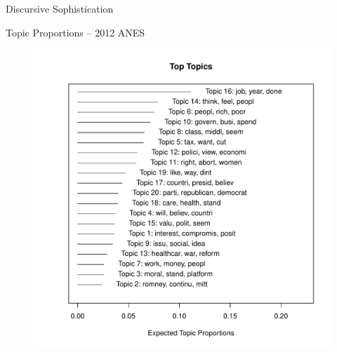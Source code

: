 \begin{frame}{Discursive Sophistication}
\begin{center}
\begin{tikzpicture}
        \end{tikzpicture}
    \end{center}
\end{frame}

\begin{frame}{Topic Proportions -- 2012 ANES}\label{stm}
  \begin{figure}
  \includegraphics[height=.85\textheight]{fig/stm_prop.pdf}
  \end{figure}
\end{frame}

